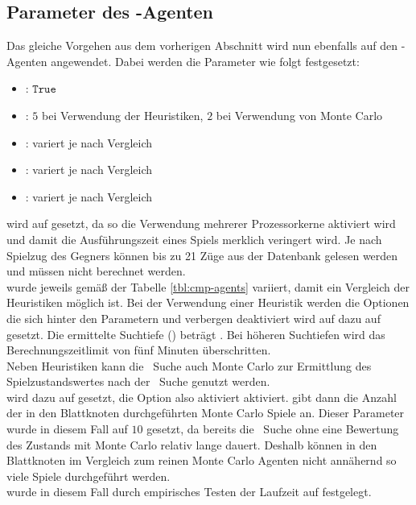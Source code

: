 \subsection{Parameter des \mxZitat{\abp}-Agenten}
\label{eval:agents:params:subsec-ab}
Das gleiche Vorgehen aus dem vorherigen Abschnitt wird nun ebenfalls auf den \mxZitat{\abp}-Agenten angewendet.
Dabei werden die Parameter wie folgt festgesetzt:
\begin{itemize}
\item {}: $\mathtt{True}$
\item {}: $5$ bei Verwendung der Heuristiken, $2$ bei Verwendung von Monte Carlo
\item {}: variert je nach Vergleich
\item {}: variert je nach Vergleich
\item {}: variert je nach Vergleich
\end{itemize}
 wird auf  gesetzt, da so die Verwendung mehrerer Prozessorkerne aktiviert wird und damit die Ausführungszeit eines Spiels merklich veringert wird. Je nach Spielzug des Gegners können bis zu 21 Züge aus der Datenbank  gelesen werden und müssen nicht berechnet werden.
\\ wurde jeweils gemäß der Tabelle \ref{tbl:cmp-agents} variiert, damit ein Vergleich der Heuristiken möglich ist. Bei der Verwendung einer Heuristik werden die Optionen die sich hinter den Parametern  und  verbergen deaktiviert  wird auf dazu auf  gesetzt. 
Die ermittelte Suchtiefe () beträgt . Bei höheren Suchtiefen wird das Berechnungszeitlimit von fünf Minuten überschritten.
\vspace{0.5cm}
\\Neben Heuristiken kann die \abab\ Suche auch Monte Carlo zur Ermittlung des Spielzustandswertes nach der \abab\ Suche genutzt werden.
\\ wird dazu auf  gesetzt, die Option also aktiviert aktiviert.  gibt dann die Anzahl der in den Blattknoten durchgeführten Monte Carlo Spiele an. Dieser Parameter wurde in diesem Fall auf $10$ gesetzt, da bereits die \abab\ Suche ohne eine Bewertung des Zustands mit Monte Carlo relativ lange dauert. Deshalb können in den Blattknoten im Vergleich zum reinen Monte Carlo Agenten nicht annähernd so viele Spiele durchgeführt werden.
\\ wurde in diesem Fall durch empirisches Testen der Laufzeit auf  festgelegt. 

